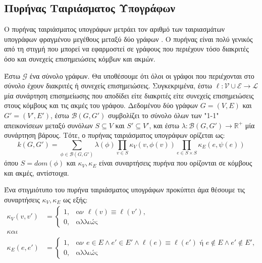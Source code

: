 \subsection{Πυρήνας Ταιριάσματος Υπογράφων}
Ο πυρήνας ταιριάσματος υπογράφων μετράει τον αριθμό των ταιριασμάτων υπογράφων φραγμένου μεγέθους μεταξύ δύο γράφων \cite{Kriege2012SubgraphMK}.
Ο πυρήνας είναι πολύ γενικός από τη στιγμή που μπορεί να εφαρμοστεί σε γράφους που περιέχουν τόσο διακριτές όσο και συνεχείς επισημειώσεις κόμβων και ακμών.\par
Έστω $\mathcal{G}$ ένα σύνολο γράφων.
Θα υποθέσουμε ότι όλοι οι γράφοι που περιέχονται στο σύνολο έχουν διακριτές ή συνεχείς επισημειώσεις.
Συγκεκριμένα, έστω $\ell : \mathcal{V} \cup \mathcal{E} \rightarrow \mathcal{L}$ μία συνάρτηση επισημείωσης που αποδίδει είτε διακριτές είτε συνεχείς επισημειώσεις στους κόμβους και τις ακμές του γράφου.
Δεδομένου δύο γράφων $G=(V,E)$ και $G'=(V',E')$, έστω $\mathcal{B}(G,G')$ συμβολίζει το σύνολο όλων των "1-1" απεικονίσεων μεταξύ συνόλων $S \subseteq V$ και $S' \subseteq V'$, και έστω $\lambda : \mathcal{B}(G,G') \rightarrow \mathbb{R}^+$ μία συνάρτηση βάρους.
Τότε, ο πυρήνας ταιριάσματος υπογράφων ορίζεται ως:
\begin{equation}
    k(G, G') = \sum_{\phi \in \mathcal{B}(G,G')} \lambda(\phi) \prod_{v \in S} \kappa_V(v, \phi(v)) \prod_{e \in S \times S} \kappa_E(e, \psi(e))
\end{equation}
όπου $S = dom(\phi)$ και $\kappa_V, \kappa_E$ είναι συναρτήσεις πυρήνα που ορίζονται σε κόμβους και ακμές, αντίστοιχα.\par
Ένα στιγμιότυπο του πυρήνα ταιριάσματος υπογράφων προκύπτει άμα θέσουμε τις συναρτήσεις $\kappa_V, \kappa_E$ ως εξής:
\begin{equation}
    \begin{split}
        \kappa_V(v,v') &= \begin{cases}
        1, & \text{αν $\ell(v) \equiv \ell(v')$},\\
        0, & \text{αλλιώς} 
        \end{cases}\\
        και\\
        \kappa_E(e,e') &= \begin{cases}
        1, & \text{αν $e \in E \wedge e' \in E' \wedge \ell(e) \equiv \ell(e')$ ή $e \not \in E \wedge e' \not \in E'$},\\
        0, & \text{αλλιώς}
        \end{cases}
    \end{split}
\end{equation}
